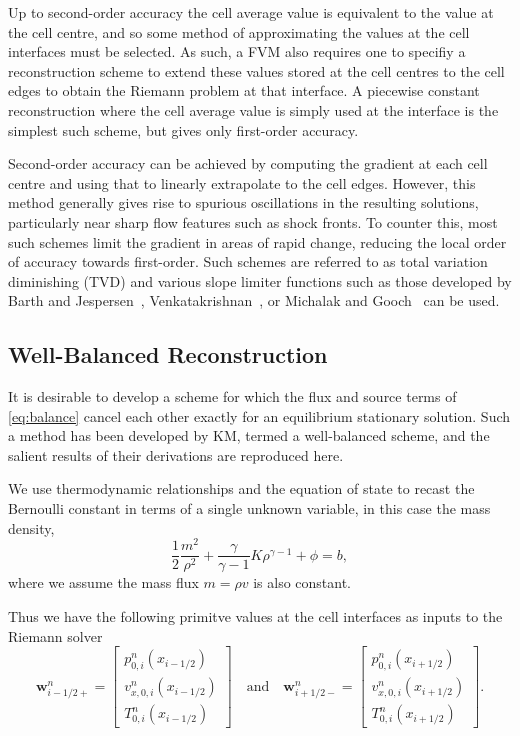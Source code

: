 Up to second-order accuracy the cell average value is equivalent to the value at the cell centre, and so some method of approximating the values at the cell interfaces must be selected. As such, a FVM also requires one to specifiy a reconstruction scheme to extend these values stored at the cell centres to the cell edges to obtain the Riemann problem at that interface. A piecewise constant reconstruction where the cell average value is simply used at the interface is the simplest such scheme, but gives only first-order accuracy.

Second-order accuracy can be achieved by computing the gradient at each cell centre and using that to linearly extrapolate to the cell edges. However, this method generally gives rise to spurious oscillations in the resulting solutions, particularly near sharp flow features such as shock fronts. To counter this, most such schemes limit the gradient in areas of rapid change, reducing the local order of accuracy towards first-order. Such schemes are referred to as total variation diminishing (TVD) and various slope limiter functions such as those developed by Barth and Jespersen~\cite{Barth1989}, Venkatakrishnan~\cite{Venkatakrishnan1993,Venkatakrishnan1995}, or Michalak and Gooch~\cite{Michalak2008} can be used.

\subsection{Well-Balanced Reconstruction}
\label{subsec:wellBalanced}

It is desirable to develop a scheme for which the flux and source terms of \eqref{eq:balance} cancel each other exactly for an equilibrium stationary solution. Such a method has been developed by KM, termed a well-balanced scheme, and the salient results of their derivations are reproduced here.

We use thermodynamic relationships and the equation of state to recast the Bernoulli constant in terms of a single unknown variable, in this case the mass density,
\begin{equation}
\frac{1}{2}\frac{m^2}{\rho^2}+\frac{\gamma}{\gamma-1}K\rho^{\gamma-1}+\phi=b,
\end{equation}
where we assume the mass flux $m=\rho v$ is also constant.

Thus we have the following primitve values at the cell interfaces as inputs to the Riemann solver
\begin{equation}
\mathbf{w}_{i-1/2+}^n=
\begin{bmatrix}
p_{0,i}^n(x_{i-1/2}) \\ v_{x,0,i}^n(x_{i-1/2}) \\ T_{0,i}^n(x_{i-1/2})
\end{bmatrix}
\quad \textrm{and} \quad \mathbf{w}_{i+1/2-}^n=
\begin{bmatrix}
p_{0,i}^n(x_{i+1/2}) \\ v_{x,0,i}^n(x_{i+1/2}) \\ T_{0,i}^n(x_{i+1/2})
\end{bmatrix}.
\end{equation}

